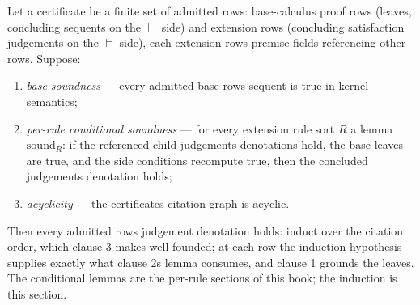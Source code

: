 \begin{brecipe}\label{rec:tc-template}
Let a certificate be a finite set of admitted rows: base-calculus
proof rows (leaves, concluding sequents on the $\vdash$ side) and
extension rows (concluding satisfaction judgements on the $\vDash$
side), each extension row\textquotesingle s premise fields referencing
other rows. Suppose:
\begin{enumerate}
\item \emph{base soundness} --- every admitted base row\textquotesingle s
  sequent is true in kernel semantics;
\item \emph{per-rule conditional soundness} --- for every extension
  rule sort $R$ a lemma $\mathrm{sound}_R$: if the referenced child
  judgements\textquotesingle{} denotations hold, the base leaves are
  true, and the side conditions recompute true, then the concluded
  judgement\textquotesingle s denotation holds;
\item \emph{acyclicity} --- the certificate\textquotesingle s citation
  graph is acyclic.
\end{enumerate}
Then every admitted row\textquotesingle s judgement denotation holds:
induct over the citation order, which clause 3 makes well-founded; at
each row the induction hypothesis supplies exactly what clause
2\textquotesingle s lemma consumes, and clause 1 grounds the leaves.
The conditional lemmas are the per-rule sections of this book; the
induction is this section.
\end{brecipe}

